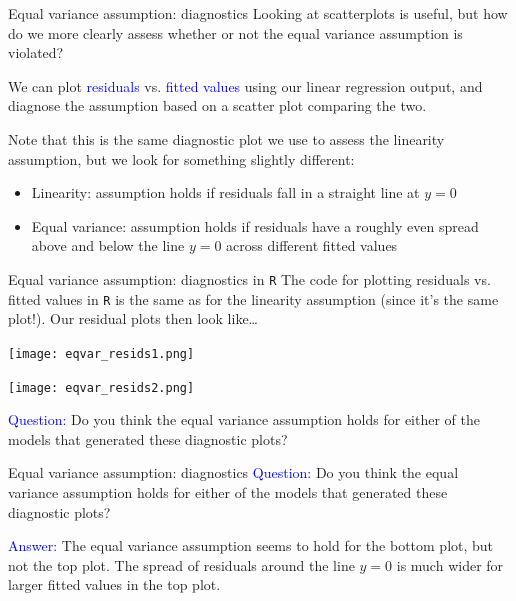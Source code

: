 \documentclass[10pt,t]{beamer}
\begin{document}
\begin{frame}{Equal variance assumption: diagnostics}
Looking at scatterplots is useful, but how do we more clearly assess whether or not the equal variance assumption is violated?

\vspace{0.3cm}

We can plot \textcolor{blue}{residuals} vs. \textcolor{blue}{fitted values} using our linear regression output, and diagnose the assumption based on a scatter plot comparing the two.

\vspace{0.3cm}

Note that this is the same diagnostic plot we use to assess the linearity assumption, but we look for something slightly different:

\vspace{0.3cm}

\begin{itemize}
	\item Linearity: assumption holds if residuals fall in a straight line at $y = 0$
	\item Equal variance: assumption holds if residuals have a roughly even spread above and below the line $y = 0$ across different fitted values
\end{itemize}

\end{frame}


\begin{frame}{Equal variance assumption: diagnostics in \texttt{R}}
The code for plotting residuals vs. fitted values in \texttt{R} is the same as for the linearity assumption (since it's the same plot!). Our residual plots then look like\dots

\centering

\texttt{[image: eqvar\_resids1.png]}

\texttt{[image: eqvar\_resids2.png]} \pause

\textcolor{blue}{Question:} Do you think the equal variance assumption holds for either of the models that generated these diagnostic plots?

\end{frame}

\begin{frame}{Equal variance assumption: diagnostics}
\textcolor{blue}{Question:} Do you think the equal variance assumption holds for either of the models that generated these diagnostic plots?

\vspace{0.3cm}

\textcolor{blue}{Answer:} The equal variance assumption seems to hold for the bottom plot, but not the top plot. The spread of residuals around the line $y = 0$ is much wider for larger fitted values in the top plot. 
\end{frame}
\end{document}
